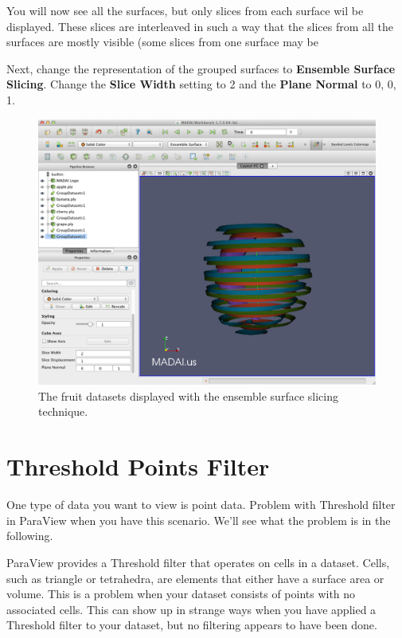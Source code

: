 \documentclass[12pt]{article}
\begin{document}
You will now see all the surfaces, but only slices from each surface wil be displayed. These slices are interleaved in such a way that the slices from all the surfaces are mostly visible (some slices from one surface may be 

Next, change the representation of the grouped surfaces to \textbf{Ensemble Surface Slicing}. Change the \textbf{Slice Width} setting to 2 and the \textbf{Plane Normal} to 0, 0, 1. 

\begin{figure}[htbp]
   \centering
   \includegraphics[scale=.25]{images/ESSSurfaces.png} %
   \caption{The fruit datasets displayed with the ensemble surface slicing technique.}
   \label{fig:ESSSurfaces}
\end{figure}

\section{Threshold Points Filter}

One type of data you want to view is point data. Problem with Threshold filter in ParaView when you have this scenario. We'll see what the problem is in the following.

ParaView provides a Threshold filter that operates on cells in a dataset. Cells, such as triangle or tetrahedra, are elements that either have a surface area or volume. This is a problem when your dataset consists of points with no associated cells. This can show up in strange ways when you have applied a Threshold filter to your dataset, but no filtering appears to have been done.
\end{document}
